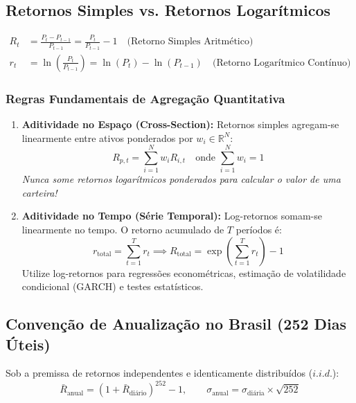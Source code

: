 \documentclass[11pt,a4paper]{article}
\begin{document}
\subsection{Retornos Simples vs. Retornos Logarítmicos}
\begin{align}
R_t &= \frac{P_t - P_{t-1}}{P_{t-1}} = \frac{P_t}{P_{t-1}} - 1 \quad \text{(Retorno Simples Aritmético)} \\
r_t &= \ln\left(\frac{P_t}{P_{t-1}}\right) = \ln(P_t) - \ln(P_{t-1}) \quad \text{(Retorno Logarítmico Contínuo)}
\end{align}

\subsubsection*{Regras Fundamentais de Agregação Quantitativa}
\begin{enumerate}
    \item \textbf{Aditividade no Espaço (Cross-Section):} Retornos simples agregam-se linearmente entre ativos ponderados por $w_i \in \mathbb{R}^N$:
    \begin{equation}
    R_{p,t} = \sum_{i=1}^N w_i R_{i,t} \quad \text{onde } \sum_{i=1}^N w_i = 1
    \end{equation}
    \textit{Nunca some retornos logarítmicos ponderados para calcular o valor de uma carteira!}
    \item \textbf{Aditividade no Tempo (Série Temporal):} Log-retornos somam-se linearmente no tempo. O retorno acumulado de $T$ períodos é:
    \begin{equation}
    r_{\text{total}} = \sum_{t=1}^T r_t \implies R_{\text{total}} = \exp\left(\sum_{t=1}^T r_t\right) - 1
    \end{equation}
    Utilize log-retornos para regressões econométricas, estimação de volatilidade condicional (GARCH) e testes estatísticos.
\end{enumerate}

\subsection{Convenção de Anualização no Brasil (252 Dias Úteis)}
Sob a premissa de retornos independentes e identicamente distribuídos ($i.i.d.$):
\begin{equation}
\bar{R}_{\text{anual}} = (1 + \bar{R}_{\text{diário}})^{252} - 1, \qquad \sigma_{\text{anual}} = \sigma_{\text{diária}} \times \sqrt{252}
\end{equation}
\end{document}
